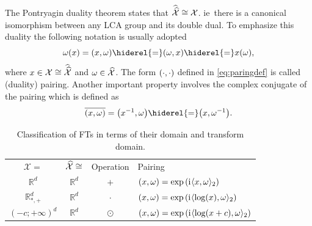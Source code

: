 \paragraph{}
The Pontryagin duality theorem states that $\widehat{\widehat{\mathcal{X}}}\cong
\mathcal{X}$. \acs{ie}~there is a canonical isomorphism between any \ac{LCA}
group and its double dual. To emphasize this duality the following notation is
usually adopted
\begin{dmath}
    \label{eq:paringdef} \omega(x) = \pairing{x, \omega} \hiderel{=}
    \pairing{\omega, x} \hiderel{=} x(\omega),
\end{dmath}
where $x\in\mathcal{X}\cong\widehat{\widehat{\mathcal{X}}}$ and
$\omega\in\widehat{\mathcal{X}}$. The form $(\cdot,\cdot)$ defined in
\cref{eq:paringdef} is called (duality) pairing. Another important property
involves the complex conjugate of the pairing which is defined as
\begin{dmath}
    \conj{\pairing{x, \omega}} = \pairing*{\inv{x}, \omega} \hiderel{=}
    \pairing*{x, \inv{\omega}}.
\end{dmath}
\begin{table}[htb]
    \caption{Classification of \acl{FT}s in terms of their domain and transform
    domain.}
    \label{tab:dual_and_pairing}
    \centering
    \begin{tabularx}{\textwidth}{cccX}
        \toprule
            \multicolumn{1}{c}{$\mathcal{X}=$} &
            \multicolumn{1}{c}{$\widehat{\mathcal{X}}\cong$} &
            \multicolumn{1}{c}{Operation} & \multicolumn{1}{l}{Pairing} \\
        \cmidrule{1-4}
            $\mathbb{R}^d$ & $\mathbb{R}^d$ & $+$ & $(x,\omega) =
            \exp\left({\mathrm{i}\mkern1mu} \langle x, \omega\rangle_2\right)$ \\ $\mathbb{R}^d_{*,+}$ &
            $\mathbb{R}^d$ & $\cdot$ & $(x,\omega) =\exp\left( {\mathrm{i}\mkern1mu}
            \langle\log(x), \omega\rangle_2 \right)$ \\ $(-c;+\infty)^d$ &
            $\mathbb{R}^d$ & $\odot$ & $(x,\omega) =\exp\left( {\mathrm{i}\mkern1mu}
            \langle\log(x+c), \omega\rangle_2 \right)$ \\
        \bottomrule
    \end{tabularx}
\end{table}
